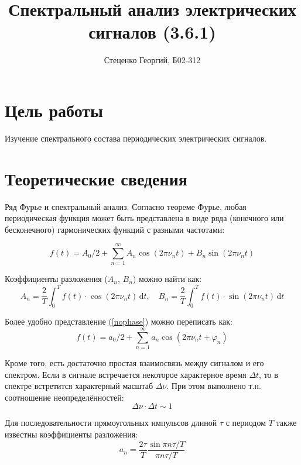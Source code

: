 \documentclass[12pt, a4paper]{article}
\title{Спектральный анализ электрических сигналов (3.6.1)}
\author{Стеценко Георгий, Б02-312}
\date{}
\begin{document}
\maketitle

\section{Цель работы}
Изучение спектрального состава периодических электрических сигналов.



\section{Теоретические сведения}
Ряд Фурье и спектральный анализ. Согласно теореме Фурье, любая периодическая функция может быть представлена в виде ряда (конечного или бесконечного) гармонических функций с разными частотами:

\begin{equation}
  f(t) = A_0/2 + \sum_{n=1}^{\infty} A_n \cos{(2\pi \nu_n t)} + B_n \sin{(2\pi \nu_n t)}
  \label{nophase}
\end{equation}

Коэффициенты разложения ($A_n$, $B_n$) можно найти как:
\begin{equation}
  A_n = \frac{2}{T} \int _0 ^ T f(t) \cdot \cos {(2\pi \nu_n t)}\,\mathrm{d}t,\quad B_n = \frac{2}{T} \int _0 ^ T f(t) \cdot \sin {(2\pi \nu_n t)}\,\mathrm{d}t
\end{equation}

Более удобно представление (\ref{nophase}) можно переписать как:
\begin{equation}
  f(t) = a_0/2 + \sum _ {n=1}^{\infty} a_n \cos{(2\pi \nu_n t + \varphi_n)}
\end{equation}

Кроме того, есть достаточно простая взаимосвязь между сигналом и его спектром. Если в сигнале встречается некоторое характерное время $\Delta t$, то в спектре встретится характерный масштаб ${\Delta \nu}$. При этом выполнено т.н. соотношение неопределённостей:
\begin{equation}
  \Delta \nu \cdot \Delta t \sim 1
  \label{ndef}
\end{equation}

Для последовательности прямоугольных импульсов длиной $\tau$ с периодом $T$ также известны коэффициенты разложения:
\begin{equation}
  a_n = \frac{2 \tau}{T} \frac{\sin {\pi n \tau /T}}{\pi n \tau /T}
  \label{rect_spectra}
\end{equation}
\end{document}

